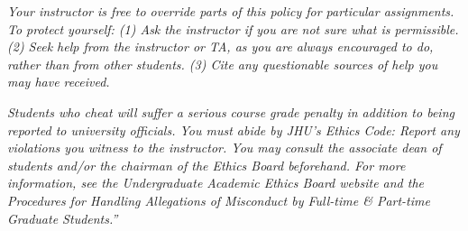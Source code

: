 \documentclass[12pt]{article}
\begin{document}
\textit{Your instructor is free to override parts of this policy for particular assignments. To protect yourself: (1) Ask the instructor if you are not sure what is permissible. (2) Seek help from the instructor or TA, as you are always encouraged to do, rather than from other students. (3) Cite any questionable sources of help you may have received.}

\textit{Students who cheat will suffer a serious course grade penalty in addition to being reported to university officials. You must abide by JHU's Ethics Code: Report any violations you witness to the instructor. You may consult the associate dean of students and/or the chairman of the Ethics Board beforehand. For more information, see the Undergraduate Academic Ethics Board website and the Procedures for Handling Allegations of Misconduct by Full-time \& Part-time Graduate Students.''}
\end{document}

